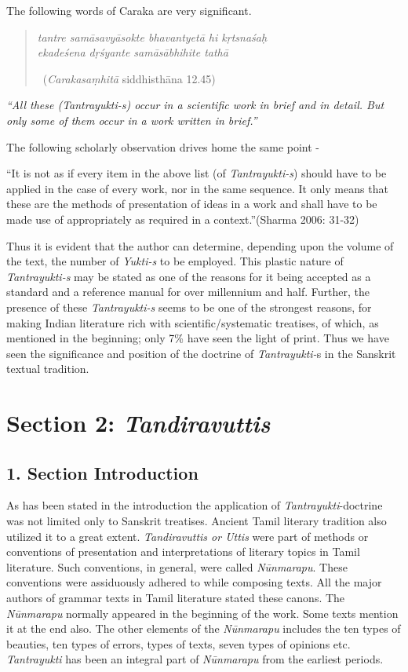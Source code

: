 The following words of Caraka are very significant.

\begin{verse}
\textit{tantre samāsavyāsokte bhavantyetā hi kṛtsnaśaḥ }\\\textit{ekadeśena dṛśyante samāsābhihite tathā  }

~\hfill (\textit{Carakasaṃhitā} siddhisthāna 12.45)
\end{verse}

\textit{“All these (Tantrayukti-s) occur in a scientific work in brief and in detail. But only some of them occur in a work written in brief.”}

The following scholarly observation drives home the same point -

“It is not as if every item in the above list (of \textit{Tantrayukti-s}) should have to be applied in the case of every work, nor in the same sequence. It only means that these are the methods of presentation of ideas in a work and shall have to be made use of appropriately as required in a context.”\hfill (Sharma 2006: 31-32)

Thus it is evident that the author can determine, depending upon the volume of the text, the number of \textit{Yukti-s} to be employed. This plastic nature of \textit{Tantrayukti-s} may be stated as one of the reasons for it being accepted as a standard and a reference manual for over millennium and half. Further, the presence of these \textit{Tantrayukti-s} seems to be one of the strongest reasons, for making Indian literature rich with scientific/systematic treatises, of which, as mentioned in the beginning; only 7\% have seen the light of print. Thus we have seen the significance and position of the doctrine of \textit{Tantrayukti-}s in the Sanskrit textual tradition.



\section*{Section 2: \textit{Tandiravuttis}}

\subsection*{1. Section Introduction}

As has been stated in the introduction the application of \textit{Tantrayukti}-doctrine was not limited only to Sanskrit treatises. Ancient Tamil literary tradition also utilized it to a great extent. \textit{Tandiravuttis or Uttis} were part of methods or conventions of presentation and interpretations of literary topics in Tamil literature. Such conventions, in general, were called \textit{Nūnmarapu}. These conventions were assiduously adhered to while composing texts. All the major authors of grammar texts in Tamil literature stated these canons. The \textit{Nūnmarapu} normally appeared in the beginning of the work. Some texts mention it at the end also. The other elements of the \textit{Nūnmarapu} includes the ten types of beauties, ten types of errors, types of texts, seven types of opinions etc. \textit{Tantrayukti} has been an integral part of \textit{Nūnmarapu} from the earliest periods.

